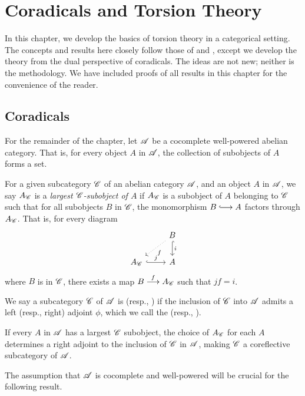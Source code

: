 \chapter{Coradicals and Torsion Theory}\label{sect_torsion_theory}

In this chapter, we develop the basics of torsion theory in a 
categorical setting. The concepts and results here closely follow
those of \cite{BJV} and \cite{DTor}, except we develop the theory
from the dual perspective of coradicals. The ideas are not new;
neither is the methodology. We have included proofs of all results 
in this chapter for the convenience of the reader.

\section{Coradicals}
\label{sect_coradicals}

For the remainder of the chapter, let $\mathscr{A}$ be a cocomplete 
well-powered abelian category. That is, for every object $A$ in 
$\mathscr{A}$, the collection of subobjects of $A$ forms a set.  

\begin{defn}
For a given subcategory $\mathscr{C}$ of an abelian category $\mathscr{A}$, 
and an object $A$ in $\mathscr{A}$, we say $A_{\mathscr{C}}$ is a
\emph{largest $\mathscr{C}$-subobject of $A$} if $A_{\mathscr{C}}$ is a 
subobject of $A$ belonging to $\mathscr{C}$ such that for all 
subobjects $B$ in $\mathscr{C}$, the monomorphism $B \into A$ factors
through $A_{\mathscr{C}}$. That is, for every diagram
\[
\begin{tikzcd}
{} &
B \arrow[hook]{d}{i} \arrow[dotted]{ld}{f} \\
A_{\Cat{C}} \arrow[hook]{r}{j} & A
\end{tikzcd}
\]
where $B$ is in $\mathscr{C}$, there exists a map $B \stackrel{f}{\longrightarrow} 
A_{\mathscr{C}}$ such that $jf = i$.

We say a subcategory $\mathscr{C}$ of $\mathscr{A}$ is 
(resp., ) if the inclusion of $\mathscr{C}$ into
$\mathscr{A}$ admits a left (resp., right) adjoint $\phi$, which we
call the  (resp., ).

If every $A$ in $\mathscr{A}$ has a largest $\mathscr{C}$ subobject, the 
choice of $A_{\mathscr{C}}$ for each $A$ determines a right adjoint to 
the inclusion of $\mathscr{C}$ in $\mathscr{A}$, making $\mathscr{C}$ a 
coreflective subcategory of $\mathscr{A}$. 
\end{defn}

The assumption that $\mathscr{A}$ is cocomplete and well-powered will 
be crucial for the following result.

